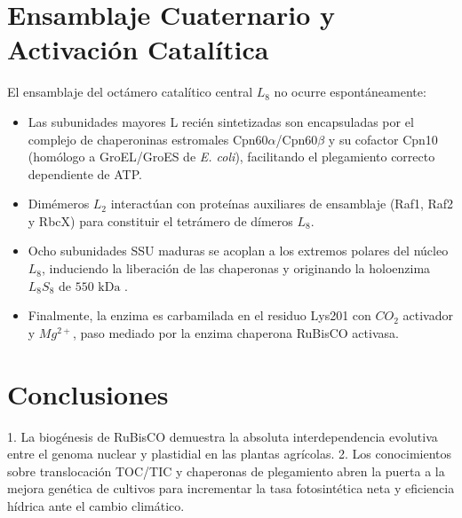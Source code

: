 \documentclass[12pt,spanish,letterpaper,oneside]{article}
\begin{document}
\section{Ensamblaje Cuaternario y Activación Catalítica}
El ensamblaje del octámero catalítico central $L_8$ no ocurre espontáneamente:
\begin{itemize}
    \item Las subunidades mayores L recién sintetizadas son encapsuladas por el complejo de chaperoninas estromales Cpn60$\alpha$/Cpn60$\beta$ y su cofactor Cpn10 (homólogo a GroEL/GroES de \textit{E. coli}), facilitando el plegamiento correcto dependiente de ATP.
    \item Dimémeros $L_2$ interactúan con proteínas auxiliares de ensamblaje (Raf1, Raf2 y RbcX) para constituir el tetrámero de dímeros $L_8$.
    \item Ocho subunidades SSU maduras se acoplan a los extremos polares del núcleo $L_8$, induciendo la liberación de las chaperonas y originando la holoenzima $L_8S_8$ de $550\text{ kDa}$ \parencite{taiz2015}.
    \item Finalmente, la enzima es carbamilada en el residuo Lys201 con $CO_2$ activador y $Mg^{2+}$, paso mediado por la enzima chaperona RuBisCO activasa.
\end{itemize}

\section{Conclusiones}
1. La biogénesis de RuBisCO demuestra la absoluta interdependencia evolutiva entre el genoma nuclear y plastidial en las plantas agrícolas.
2. Los conocimientos sobre translocación TOC/TIC y chaperonas de plegamiento abren la puerta a la mejora genética de cultivos para incrementar la tasa fotosintética neta y eficiencia hídrica ante el cambio climático.

\newpage
\printbibliography[title={Referencias bibliográficas}]
\end{document}
